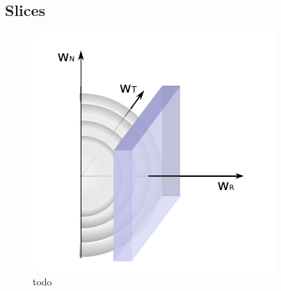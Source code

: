 \clearpage
\subsection{Slices}



\begin{figure}[h]
	\includegraphics[width=.4\textwidth]{Figures/sketch_slice_R2.pdf}
	\centering
	\caption{todo}
	\label{fig:sketch_slice_R}
\end{figure}


